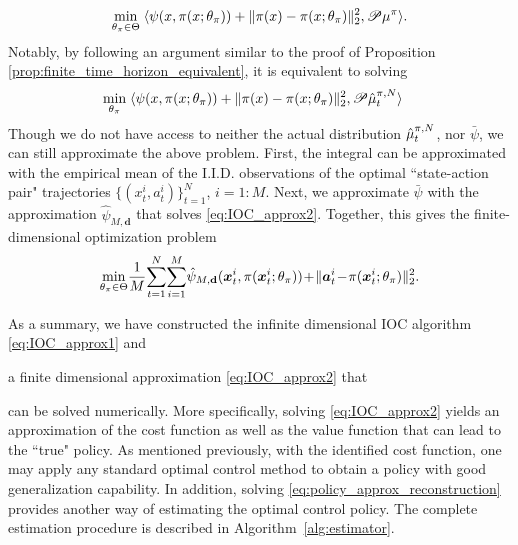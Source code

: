 \[
\min_{\theta_\pi\in\Theta} \; \langle\relax{\psi}(x, \pi(x;\theta_\pi)) +\| \relax{\pi}(x) - \pi(x;\theta_\pi) \|_2^2,\mathscr{P}\mu^{\relax{\pi}}\rangle.
\]
Notably, by following an argument similar to the proof of Proposition \ref{prop:finite_time_horizon_equivalent}, it is equivalent to solving
\begin{align}
\min_{\theta_\pi} \; & \langle\relax{\psi}(x, \pi(x;\theta_\pi))+\| \relax{\pi}(x) - \pi(x;\theta_\pi) \|_2^2,\mathscr{P}\hat{\mu}_t^{\relax{\pi},N}\rangle
\label{eq:policy-approx-reconstruction-infinite}
\end{align}
Though we do not have access to neither the actual distribution $\hat{\mu}_t^{\relax{\pi},N}$, nor $\bar{\psi}$, we can still approximate the above problem. First, the integral can be approximated with the empirical mean of the I.I.D. observations of the optimal ``state-action pair" trajectories $\{(x_t^i,a_t^i)\}_{t=1}^N$, $i=1:M$. Next, we approximate $\bar{\psi}$ with the approximation $\hat{\psi}_{M,\mathbf{d}}$ that solves \eqref{eq:IOC_approx2}. Together, this gives the finite-dimensional optimization problem
\begin{align}
\min_{\theta_\pi\in \Theta} \! \frac{1}{M}\!\sum_{t=1}^N\!\sum_{i=1}^M\! \hat{\psi}_{M,\mathbf{d}}(\mfx_t^i, \pi(\mfx_t^i;\theta_\pi)) \!+\! \| \mfa_t^i \!-\! \pi(\mfx_t^i;\theta_\pi) \|_2^2.
\label{eq:policy_approx_reconstruction}
\end{align}

As a summary, we have constructed the infinite dimensional IOC algorithm \eqref{eq:IOC_approx1} and

a finite dimensional approximation \eqref{eq:IOC_approx2} that

can be solved numerically. 
More specifically, solving \eqref{eq:IOC_approx2} yields an approximation of the cost function as well as the value function that can lead to the ``true" policy.
As mentioned previously, with the identified cost function, one may apply any standard optimal control method to obtain a policy with good generalization capability.
In addition, solving \eqref{eq:policy_approx_reconstruction} provides another way of estimating the optimal control policy. The complete estimation procedure is described in Algorithm~\ref{alg:estimator}. 


